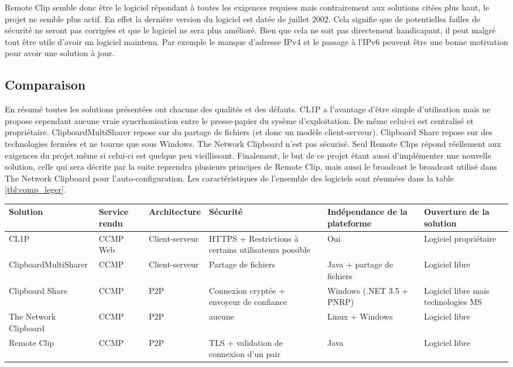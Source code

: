 Remote Clip semble donc être le logiciel répondant à toutes les
exigences requises mais contrairement aux solutions citées plus haut,
le projet ne semble plus actif. En effet la dernière version du logiciel
est datée de juillet 2002. Cela signifie que de potentielles failles
de sécurité ne seront pas corrigées et que le logiciel ne sera plus amélioré.
Bien que cela ne soit pas directement handicapant, il
peut malgré tout être utile d'avoir un logiciel maintenu. Par exemple
le manque d'adresse IPv4 et le passage à l'IPv6 peuvent être une bonne
motivation pour avoir une solution à jour.

\subsection{Comparaison}
En résumé toutes les solutions présentées ont chacune des qualités et des
défauts. CL1P a l'avantage d'être simple d'utilisation mais ne propose
cependant aucune vraie syncrhonisation entre le presse-papier du sysème
d'exploitation. De même celui-ci est centralisé et propriétaire.
ClipboardMultiSharer repose sur du partage de fichiers (et donc un
modèle client-serveur). Clipboard Share repose sur des technologies fermées
et ne tourne que sous Windows. The Network Clipboard n'est pas sécurisé.
Seul Remote Clips répond réellement aux exigences du projet même si celui-ci
est quelque peu vieillissant. Finalement, le but de ce projet étant aussi
d'implémenter une nouvelle solution, celle qui sera décrite par la suite
reprendra plusieurs principes de Remote Clip, mais aussi le broadcast le
broadcast utilisé dans The Network Clipboard pour l'auto-configuration.
Les caractéristiques de l'ensemble des logiciels sont résumées dans la
table \ref{tbl:comp_leger}.

\begin{sidewaystable}[!h]
  \centering
  \begin{tabular}{|l|l|l|m{7em}|m{7em}|m{7em}|}
    \hline
    Solution & Service rendu & Architecture & Sécurité & In\-dé\-pen\-dance
    de la plateforme & Ouverture de la solution \\
    \hline
    \hline
    CL1P & CCMP Web & Client-serveur & HTTPS + Restrictions à certains
    utilisateurs possible & Oui & Logiciel propriétaire \\
    \hline
    Clipboard\-MultiSharer & CCMP & Client-serveur & Partage de fichiers & Java
    + partage de fichiers & Logiciel libre\\
    \hline
    Clipboard Share & CCMP & P2P & Connexion cryptée + envoyeur de confiance &
    Windows (.NET 3.5 + PNRP) & Logiciel libre mais technologies MS \\
    \hline
    The Network Clipboard & CCMP & P2P & aucune & Linux + Windows &
    Logiciel libre \\
    \hline
    Remote Clip & CCMP & P2P & TLS + validation de connexion d'un pair &
    Java & Logiciel libre \\
    \hline
  \end{tabular}
  \caption{\label{tbl:comp_leger} Comparaison des solutions légères}
\end{sidewaystable}
\clearpage
